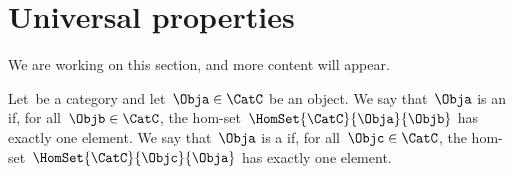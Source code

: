 


\section{Universal properties}
\begin{publictodo}We are working on this section, and more content will appear.\end{publictodo}


\begin{ctdefinition}
  \label{def:initial_terminal_object}
  Let~\CatC be a category and let~$\Obja \in \CatC$ be an object.
  We say that~$\Obja$ is an \emph{} if, for all~$\Objb \in\CatC$, the hom-set~$\HomSet{\CatC}{\Obja}{\Objb}$ has exactly one element.
  We say that~$\Obja$ is a \emph{} if, for all~$\Objc\in\CatC$, the hom-set~$\HomSet{\CatC}{\Objc}{\Obja}$ has exactly one element.
\end{ctdefinition}

